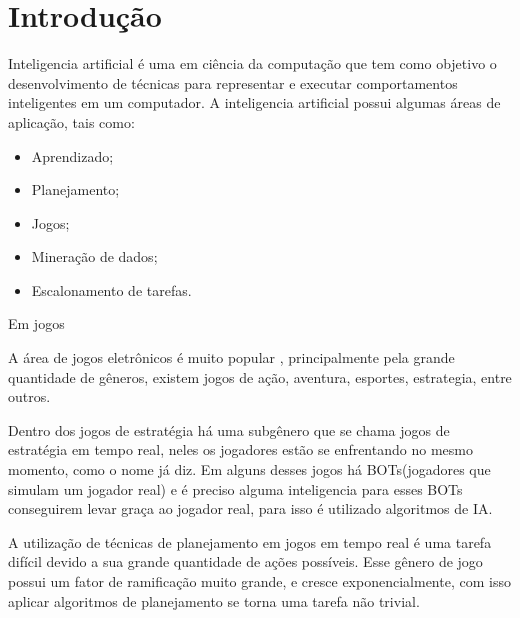 \chapter{\label{chap:intro}Introdução}



Inteligencia artificial é uma em ciência da computação que tem como objetivo o desenvolvimento de técnicas para representar e executar comportamentos inteligentes em um computador. 
A inteligencia artificial possui algumas áreas de aplicação, tais como: %
\begin{itemize}
	\item Aprendizado;
	\item Planejamento;
	\item Jogos;
	\item Mineração de dados;
	\item Escalonamento de tarefas.
\end{itemize}


Em jogos

A área de jogos eletrônicos é muito popular %
, principalmente pela grande quantidade de gêneros, existem jogos de ação, aventura, esportes, estrategia, entre outros. 


Dentro dos jogos de estratégia há uma subgênero que se chama jogos de estratégia em tempo real, neles os jogadores estão se enfrentando no mesmo momento, como o nome já diz. 
Em alguns desses jogos há BOTs(jogadores que simulam um jogador real) e é preciso alguma inteligencia para esses BOTs conseguirem levar graça ao jogador real, para isso é utilizado algoritmos de IA. 

A utilização de técnicas de planejamento em jogos em tempo real é uma tarefa difícil devido a sua grande quantidade de ações possíveis. 
Esse gênero de jogo possui um fator de ramificação muito grande, e cresce exponencialmente, com isso aplicar algoritmos de planejamento se torna uma tarefa não trivial. 


